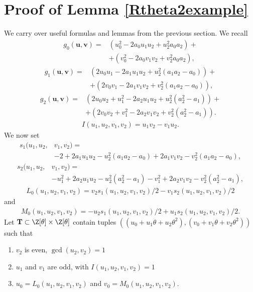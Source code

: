 \documentclass[12pt]{amsart}
\newcommand{\1}{\mathmybb{1}}
\begin{document}
\section{Proof of Lemma \ref{Rtheta2example}}
\label{Substitutioninspirationcubicpol}
We carry over useful formulas and lemmas from the previous section. We recall
\begin{align*}
g_{0}(\mathbf{u},\mathbf{v}) = &(u_{0}^2-2a_{0}u_{1}u_{2}+u_{2}^2a_{0}a_{2})+\\
&+(v_{0}^2-2a_{0}v_{1}v_{2}+v_{2}^2a_{0}a_{2}),
\end{align*}
\begin{align*}
g_{1}(\mathbf{u},\mathbf{v}) = &\left(2u_{0}u_{1}-2a_{1}u_{1}u_{2}+u_{2}^2(a_{1}a_{2}-a_{0})\right) +\\
&+\left(2v_{0}v_{1}-2a_{1}v_{1}v_{2}+v_{2}^2(a_{1}a_{2}-a_{0})\right),
\end{align*}
\begin{align*}
g_{2}(\mathbf{u},\mathbf{v}) = &(2u_{0}u_{2}+u_{1}^2 -2a_{2}u_{1}u_{2}+u_{2}^2(a_{2}^2-a_{1}))+\\
&+(2v_{0}v_{2}+v_{1}^2 -2a_{2}v_{1}v_{2}+v_{2}^2(a_{2}^2-a_{1})).
\end{align*}
\begin{align*}
I(u_{1},u_{2},v_{1},v_{2}) = u_{1}v_{2}-v_{1}u_{2}.
\end{align*}
We now set
\begin{align*}
s_{1}(u_{1},u_{2},& v_{1},v_{2}) = \\
&-2+2a_{1}u_{1}u_{2}-u_{2}^2(a_{1}a_{2}-a_{0})+2a_{1}v_{1}v_{2}-v_{2}^2(a_{1}a_{2}-a_{0}),
\end{align*}
\begin{align*}
s_{2}(u_{1},u_{2},& v_{1},v_{2}) = \\
& -u_{1}^2+2a_{2}u_{1}u_{2}-u_{2}^2(a_{2}^2-a_{1}) -v_{1}^2+2a_{2}v_{1}v_{2}-v_{2}^2(a_{2}^2-a_{1}),
\end{align*}
\begin{align*}
L_{0}(u_{1},u_{2},v_{1},v_{2}) = v_{2} s_{1}(u_{1},u_{2},v_{1},v_{2})/2 - v_{1} s_{2}(u_{1},u_{2},v_{1},v_{2})/2
\end{align*}
and
\begin{align*}
M_{0}(u_{1},u_{2},v_{1},v_{2}) = -u_{2} s_{1}(u_{1},u_{2},v_{1},v_{2})/2 +u_{1}s_{2}(u_{1},u_{2},v_{1},v_{2})/2.
\end{align*}
Let $\mathbf{T} \subset \Z[\theta]\times\Z[\theta]$ contain tuples $((u_{0}+u_{1}\theta+u_{2}\theta^2), (v_{0}+v_{1}\theta+v_{2}\theta^2))$ such that 
\begin{enumerate}
\item $v_{2}$ is even, $\gcd(u_{2},v_{2}) = 1$
\item $u_{1}$ and $v_{1}$ are odd, with $I(u_{1},u_{2},v_{1},v_{2}) = 1$
\item $u_{0} = L_{0}(u_{1},u_{2},v_{1},v_{2})$ and $v_{0} = M_{0}(u_{1},u_{2},v_{1},v_{2})$.
\end{enumerate}
\end{document}
